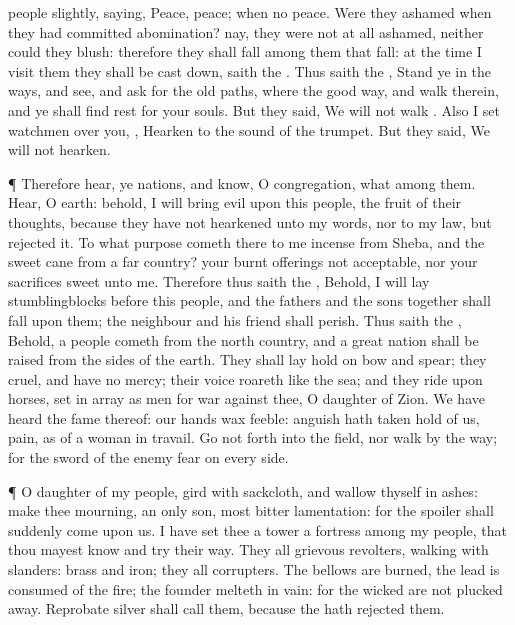 {people
slightly,
saying,
Peace,
peace; when
{} no
peace.
Were they
ashamed when they had
committed
abomination?
nay, they were not at
all
ashamed,
neither
could they
blush: therefore they shall
fall among them that
fall: at the
time
{} I
visit them they shall be cast
down,
saith the
{}.
Thus
saith the
{},
Stand ye in the
ways, and
see, and
ask for the
old
paths, where
{} the
good
way, and
walk therein, and ye shall
find
rest for your
souls. But they
said, We will not
walk
{}.
Also I
set
watchmen over you,
{},
Hearken to the
sound of the
trumpet. But they
said, We will not
hearken.
\par }{\PP {}¶ Therefore
hear, ye
nations, and
know, O
congregation, what
{} among them.
Hear, O
earth: behold, I will
bring
evil upon this
people,
{} the
fruit of their
thoughts, because they have not
hearkened unto my
words, nor to my
law, but
rejected it.
To what purpose
cometh there to me
incense from
Sheba, and the
sweet
cane from a
far
country? your burnt
offerings
{} not
acceptable, nor your
sacrifices
sweet unto me.
Therefore thus
saith the
{}, Behold, I will
lay
stumblingblocks before this
people, and the
fathers and the
sons
together shall
fall upon them; the
neighbour and his
friend shall
perish.
Thus
saith the
{}, Behold, a
people
cometh from the
north
country, and a
great
nation shall be
raised from the
sides of the
earth.
They shall lay
hold on
bow and
spear; they
{}
cruel, and have no
mercy; their
voice
roareth like the
sea; and they
ride upon
horses, set in
array as
men for
war against thee, O
daughter of
Zion.
We have
heard the
fame thereof: our
hands wax
feeble:
anguish hath taken
hold of us,
{}
pain, as of a woman in
travail.
Go not
forth into the
field, nor
walk by the
way; for the
sword of the
enemy
{}
fear
{} on every
side.
\par }{\PP {}¶ O
daughter of my
people,
gird
{} with
sackcloth, and
wallow thyself in
ashes:
make thee
mourning,
{} an only
son, most
bitter
lamentation: for the
spoiler shall
suddenly
come upon us.
I have
set thee
{} a
tower
{} a
fortress among my
people, that thou mayest
know and
try their
way.
They
{} all
grievous
revolters,
walking with
slanders:
{}
brass and
iron; they
{} all
corrupters.
The
bellows are
burned, the
lead is
consumed of the
fire; the
founder
melteth in
vain: for the
wicked are not plucked
away.
Reprobate
silver shall
{}
call them, because the
{} hath
rejected them.

}
